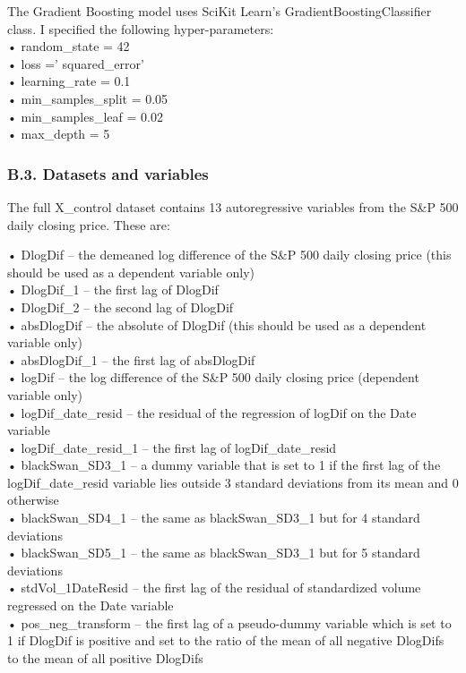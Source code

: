 \documentclass[11pt,preprint, authoryear]{elsarticle}
\numberwithin{equation}{section}
\numberwithin{figure}{section}
\numberwithin{table}{section}
\begin{document}
The Gradient Boosting model uses SciKit Learn's
GradientBoostingClassifier class. I specified the following
hyper-parameters:\\
• random\_state = 42\\
• loss =' squared\_error'\\
• learning\_rate = 0.1\\
• min\_samples\_split = 0.05\\
• min\_samples\_leaf = 0.02\\
• max\_depth = 5

\hypertarget{b.3.-datasets-and-variables}{%
\subsubsection*{B.3. Datasets and
variables}\label{b.3.-datasets-and-variables}}

The full X\_control dataset contains 13 autoregressive variables from
the S\&P 500 daily closing price. These are:

• DlogDif -- the demeaned log difference of the S\&P 500 daily closing
price (this should be used as a dependent variable only)\\
• DlogDif\_1 -- the first lag of DlogDif\\
• DlogDif\_2 -- the second lag of DlogDif\\
• absDlogDif -- the absolute of DlogDif (this should be used as a
dependent variable only)\\
• absDlogDif\_1 -- the first lag of absDlogDif\\
• logDif -- the log difference of the S\&P 500 daily closing price
(dependent variable only)\\
• logDif\_date\_resid -- the residual of the regression of logDif on the
Date variable\\
• logDif\_date\_resid\_1 -- the first lag of logDif\_date\_resid\\
• blackSwan\_SD3\_1 -- a dummy variable that is set to 1 if the first
lag of the logDif\_date\_resid variable lies outside 3 standard
deviations from its mean and 0 otherwise\\
• blackSwan\_SD4\_1 -- the same as blackSwan\_SD3\_1 but for 4 standard
deviations\\
• blackSwan\_SD5\_1 -- the same as blackSwan\_SD3\_1 but for 5 standard
deviations\\
• stdVol\_1DateResid -- the first lag of the residual of standardized
volume regressed on the Date variable\\
• pos\_neg\_transform -- the first lag of a pseudo-dummy variable which
is set to 1 if DlogDif is positive and set to the ratio of the mean of
all negative DlogDifs to the mean of all positive DlogDifs
\end{document}
